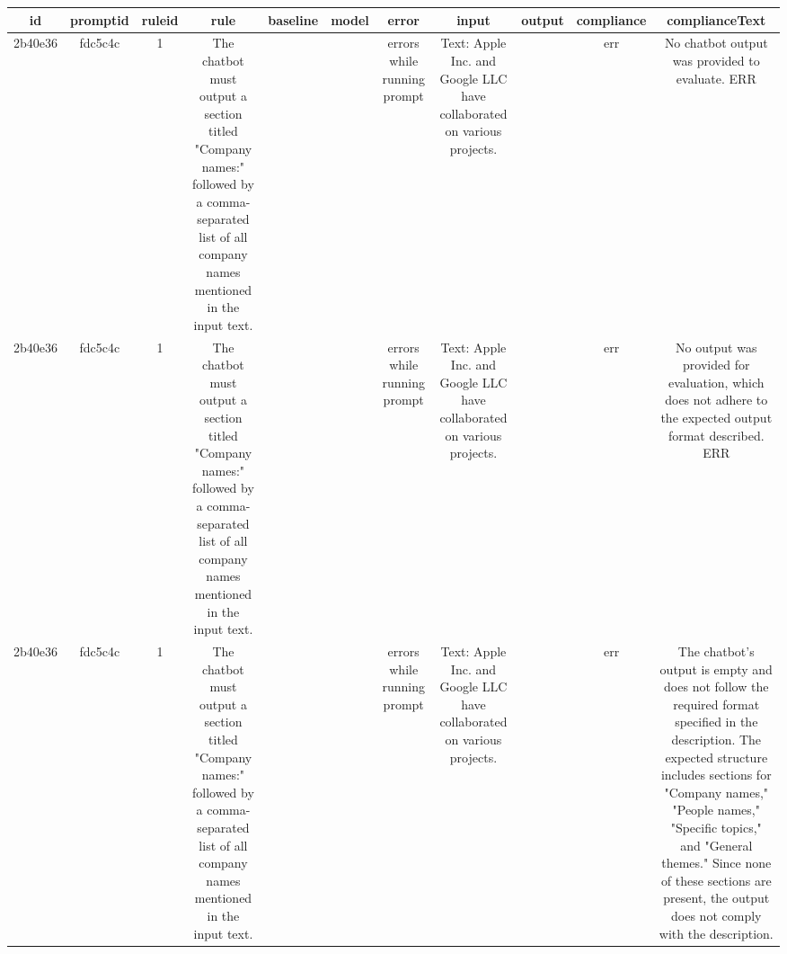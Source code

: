 
  \begin{table}[h!]
  \centering
  \begin{tabular}{|c|c|c|c|c|c|c|c|c|c|c|}
  \hline
  id & promptid & ruleid & rule & baseline & model & error & input & output & compliance & complianceText \\
  \hline
  2b40e36 & fdc5c4c & 1 & The chatbot must output a section titled "Company names:" followed by a comma-separated list of all company names mentioned in the input text. &  &  & errors while running prompt & Text: Apple Inc. and Google LLC have collaborated on various projects. &  & err & No chatbot output was provided to evaluate.
ERR\\
\hline
2b40e36 & fdc5c4c & 1 & The chatbot must output a section titled "Company names:" followed by a comma-separated list of all company names mentioned in the input text. &  &  & errors while running prompt & Text: Apple Inc. and Google LLC have collaborated on various projects. &  & err & No output was provided for evaluation, which does not adhere to the expected output format described.
ERR\\
\hline
2b40e36 & fdc5c4c & 1 & The chatbot must output a section titled "Company names:" followed by a comma-separated list of all company names mentioned in the input text. &  &  & errors while running prompt & Text: Apple Inc. and Google LLC have collaborated on various projects. &  & err & The chatbot's output is empty and does not follow the required format specified in the description. The expected structure includes sections for "Company names," "People names," "Specific topics," and "General themes." Since none of these sections are present, the output does not comply with the description.


\end{tabular}
\end{table}
